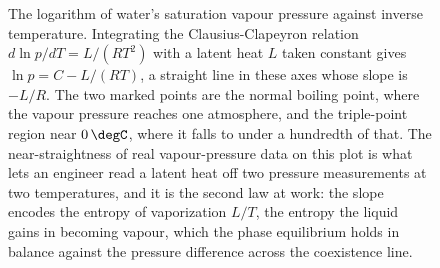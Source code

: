 \begin{figure}[htbp]
\centering
{}
\caption[Clausius-Clapeyron plot of water's vapour pressure]{The logarithm of
water's saturation vapour pressure against inverse temperature. Integrating the
Clausius-Clapeyron relation $d\ln p/dT = L/(RT^2)$ with a latent heat $L$ taken
constant gives $\ln p = C - L/(RT)$, a straight line in these axes whose slope
is $-L/R$. The two marked points are the normal boiling point, where the vapour
pressure reaches one atmosphere, and the triple-point region near $0\,\degC$,
where it falls to under a hundredth of that. The near-straightness of real
vapour-pressure data on this plot is what lets an engineer read a latent heat
off two pressure measurements at two temperatures, and it is the second law at
work: the slope encodes the entropy of vaporization $L/T$, the entropy the
liquid gains in becoming vapour, which the phase equilibrium holds in balance
against the pressure difference across the coexistence line.}
\label{fig:vol04ch04:clausius-clapeyron}
\end{figure}
